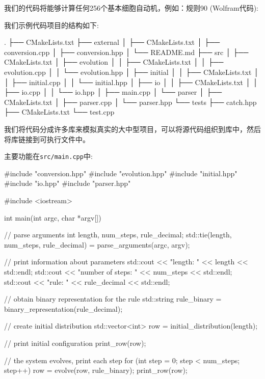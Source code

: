我们的代码将能够计算任何256个基本细胞自动机，例如：规则90 (Wolfram代码):


我们示例代码项目的结构如下:

\begin{codebox}[shell]
.
├── CMakeLists.txt
├── external
│    ├── CMakeLists.txt
│    ├── conversion.cpp
│    ├── conversion.hpp
│    └── README.md
├── src
│    ├── CMakeLists.txt
│    ├── evolution
│    │    ├── CMakeLists.txt
│    │    ├── evolution.cpp
│    │    └── evolution.hpp
│    ├── initial
│    │    ├── CMakeLists.txt
│    │    ├── initial.cpp
│    │    └── initial.hpp
│    ├── io
│    │    ├── CMakeLists.txt
│    │    ├── io.cpp
│    │    └── io.hpp
│    ├── main.cpp
│    └── parser
│        ├── CMakeLists.txt
│        ├── parser.cpp
│        └── parser.hpp
└── tests
    ├── catch.hpp
    ├── CMakeLists.txt
    └── test.cpp
\end{codebox}

我们将代码分成许多库来模拟真实的大中型项目，可以将源代码组织到库中，然后将库链接到可执行文件中。

主要功能在\texttt{src/main.cpp}中:

\begin{codebox}[cpp]
#include "conversion.hpp"
#include "evolution.hpp"
#include "initial.hpp"
#include "io.hpp"
#include "parser.hpp"

#include <iostream>

int main(int argc, char *argv[]) {
  // parse arguments
  int length, num_steps, rule_decimal;
  std::tie(length, num_steps, rule_decimal) = parse_arguments(argc, argv);
  
  // print information about parameters
  std::cout << "length: " << length << std::endl;
  std::cout << "number of steps: " << num_steps << std::endl;
  std::cout << "rule: " << rule_decimal << std::endl;
  
  // obtain binary representation for the rule
  std::string rule_binary = binary_representation(rule_decimal);
  
  // create initial distribution
  std::vector<int> row = initial_distribution(length);
  
  // print initial configuration
  print_row(row);
  
  // the system evolves, print each step
  for (int step = 0; step < num_steps; step++) {
    row = evolve(row, rule_binary);
    print_row(row);
  }
}
\end{codebox}

